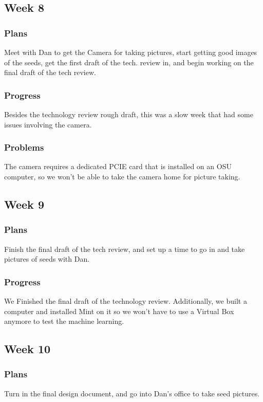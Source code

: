 \documentclass[onecolumn, draftclsnofoot,10pt, compsoc]{IEEEtran}
\begin{document}
    \subsection{Week 8}
    
        \subsubsection{Plans}
        Meet with Dan to get the Camera for taking pictures, start getting good images of the seeds, get the first draft of the tech. review in, and begin working on the final draft of the tech review.
        \subsubsection{Progress}
        Besides the technology review rough draft, this was a slow week that had some issues involving the camera. 
        \subsubsection{Problems}
        The camera requires a dedicated PCIE card that is installed on an OSU computer, so we won't be able to take the camera home for picture taking.
    \subsection{Week 9}
    
        \subsubsection{Plans}
        Finish the final draft of the tech review, and set up a time to go in and take pictures of seeds with Dan.
        
        \subsubsection{Progress}
        We Finished the final draft of the technology review. Additionally, we built a computer and installed Mint on it so we won't have to use a Virtual Box anymore to test the machine learning. 

    \subsection{Week 10}
        \subsubsection{Plans}
        Turn in the final design document, and go into Dan's office to take seed pictures.
        
\end{document}
